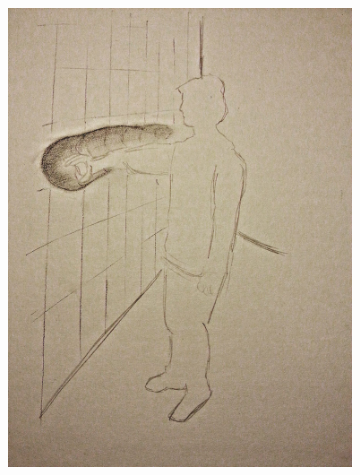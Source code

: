 \begin{figure}[h]
  \centering
  \begin{subfigure}[t]{.44\textwidth}
    \centering
    \includegraphics[width=\linewidth]{figures/jamming/concepts/impro/carve}
  \end{subfigure}%
  \hspace{0.02\textwidth}
  \begin{subfigure}[t]{.44\textwidth}
    \centering

\end{subfigure}
\end{figure}
